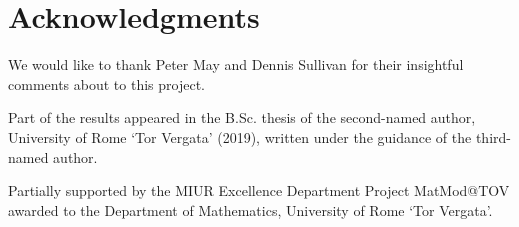 
\section*{Acknowledgments}

We would like to thank Peter May and Dennis Sullivan for their insightful comments about to this project.

Part of the results appeared in the B.Sc. thesis of the second-named author, University of Rome `Tor Vergata' (2019), written under the guidance of the third-named author.

 Partially supported by the MIUR Excellence Department Project
MatMod@TOV awarded to the Department of Mathematics, University of Rome
`Tor Vergata'.